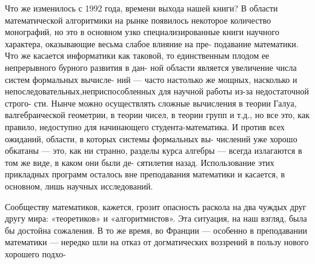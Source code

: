 {{   Что же изменилось с 1992 года, времени выхода нашей книги? В\linebreak
области математической алгоритмики на рынке появилось некоторое\linebreak
количество монографий, но это в основном узко специализированные\linebreak
книги научного характера, оказывающие весьма слабое влияние на пре-\linebreak
подавание математики. Что же касается информатики как таковой,\linebreak
то единственным плодом ее непрерывного бурного развития в дан-\linebreak
ной области является увеличение числа систем формальных вычисле-\linebreak
ний — часто настолько же мощных, насколько и непоследовательных,\linebreak неприспособленных для научной работы из-за недостаточной строго-\linebreak
сти. Нынче можно осуществлять сложные вычисления в теории Галуа, в\linebreak алгебраической геометрии, в теории чисел, в теории групп и т.д., но все\linebreak
это, как правило, недоступно для начинающего студента-математика.\linebreak
И против всех ожиданий, области, в которых системы формальных вы-\linebreak
числений уже хорошо обкатаны — это, как ни странно, разделы курса\linebreak
алгебры — всегда излагаются в том же виде, в каком они были де-\linebreak
сятилетия назад. Использование этих прикладных программ осталось\linebreak
вне преподавания математики и касается, в основном, лишь научных\linebreak
исследований.

   Сообществу математиков, кажется, грозит опасность раскола на\linebreak
два чуждых друг другу мира: «теоретиков» и «алгоритмистов». Эта
\linebreak
ситуация, на наш взгляд, была бы достойна сожаления. В то же время,\linebreak
во Франции — особенно в преподавании математики — нередко шли\linebreak
на отказ от догматических воззрений в пользу нового хорошего подхо-\linebreak

}}
